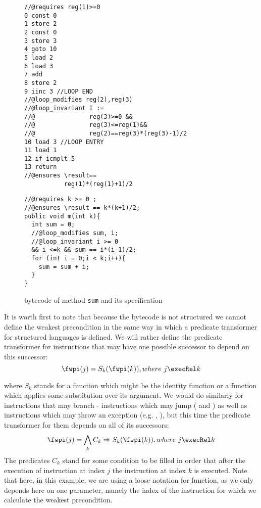   
\begin{figure}[ht!]
\begin{center}
\begin{minipage}[c]{\linewidth} 
\begin{minipage}[c]{.63\linewidth}
\scriptsize{
\begin{lstlisting}[frame=trbl]
//@requires reg(1)>=0
0 const 0
1 store 2
2 const 0
3 store 3
4 goto 10
5 load 2
6 load 3
7 add
8 store 2
9 iinc 3 //LOOP END
//@loop_modifies reg(2),reg(3)
//@loop_invariant I := 
//@               reg(3)>=0 &&
//@               reg(3)<=reg(1)&&
//@               reg(2)==reg(3)*(reg(3)-1)/2
10 load 3 //LOOP ENTRY 
11 load 1
12 if_icmplt 5 
13 return
//@ensures \result==
           reg(1)*(reg(1)+1)/2
\end{lstlisting}} 
\end{minipage}


\begin{minipage}[c]{.63\linewidth} 
\scriptsize{
\begin{lstlisting}[frame=trbl]
//@requires k >= 0 ;
//@ensures \result == k*(k+1)/2;
public void m(int k){
  int sum = 0;
  //@loop_modifies sum, i;
  //@loop_invariant i >= 0 
  && i <=k && sum == i*(i-1)/2;
  for (int i = 0;i < k;i++){
    sum = sum + i;
  } 
}
\end{lstlisting} }
\end{minipage}
\end{minipage}
\end{center}
\caption{\sc  bytecode of method \lstinline!sum! and its specification }
\label{wp:example:sum}
\end{figure}


 It is worth first to note that because the bytecode is not structured we cannot define
 the weakest precondition in the same way in which a predicate transformer for structured
 languages is defined.  
 We will rather  define the predicate transformer for  instructions that may have one possible successor to depend on
 this successor:
$$\fwpi( j ) =  S_k(\fwpi( k )) , where  \ j \execRel k $$

where $S_k$ stands for a function which might be the identity function or a function which applies some substitution over its argument.
 We would do similarly for instructions that may branch - instructions which may jump (\goto{} and \ifCond{}) as well as instructions
 which may throw an exception (e.g. \putfield, \arrstore), but this time the predicate transformer for them depends on all of its successors:
$$\fwpi( j ) = \bigwedge_k  C_k \Rightarrow S_k(\fwpi( k )) , where  \ j \execRel k $$
The predicates $C_k$ stand for some condition to be filled in order that after the execution of instruction at index $j$ the instruction at index $k$ is executed.
Note that here, in this example, we are using a loose notation for \wpName{}  function, as we only depends here on one parameter, namely the index
of the instruction for which we calculate the weakest precondition.

